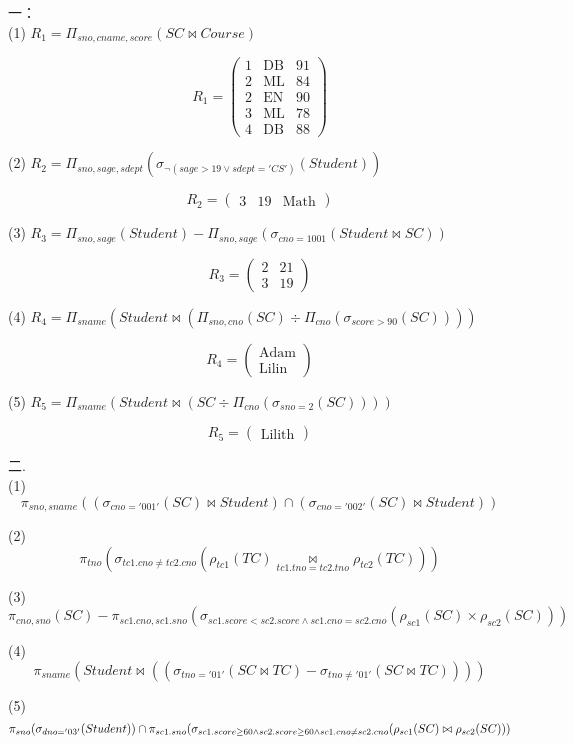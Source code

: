 \documentclass{article}
\begin{document}
一：\\
(1) $R_1 = \Pi_{sno,cname,score}(SC \bowtie Course)$

\[
R_1 = \begin{pmatrix}
1 & \text{DB} & 91 \\
2 & \text{ML} & 84 \\
2 & \text{EN} & 90 \\
3 & \text{ML} & 78 \\
4 & \text{DB} & 88
\end{pmatrix}
\]

(2) $R_2 = \Pi_{sno,sage,sdept}(\sigma_{\neg(sage>19 \vee sdept='CS')}(Student))$

\[
R_2 = \begin{pmatrix}
3 & 19 & \text{Math}
\end{pmatrix}
\]

(3) $R_3 = \Pi_{sno,sage}(Student) - \Pi_{sno,sage}(\sigma_{cno=1001}(Student \bowtie SC))$

\[
R_3 = \begin{pmatrix}
2 & 21 \\
3 & 19
\end{pmatrix}
\]

(4) $R_4 = \Pi_{sname}(Student \bowtie (\Pi_{sno,cno}(SC) \div \Pi_{cno}(\sigma_{score>90}(SC))))$

\[
R_4 = \begin{pmatrix}
\text{Adam} \\
\text{Lilin}
\end{pmatrix}
\]

(5) $R_5 = \Pi_{sname}(Student \bowtie (SC \div \Pi_{cno}(\sigma_{sno=2}(SC))))$

\[
R_5 = \begin{pmatrix}
\text{Lilith}
\end{pmatrix}
\]


二.\\
(1)
\[
\pi_{sno, sname} ((\sigma_{cno='001'} (SC) \bowtie Student) \cap (\sigma_{cno='002'} (SC) \bowtie Student)) 
\]

(2)
\[
\pi_{tno}(\sigma_{tc1.cno \neq tc2.cno} (\rho_{tc1}(TC) \underset{tc1.tno = tc2.tno}{\bowtie} \rho_{tc2}(TC)))
\]

(3)
\[
\pi_{cno, sno} (SC) - \pi_{sc1.cno, sc1.sno} 
(\sigma_{sc1.score < sc2.score \wedge sc1.cno = sc2.cno} (\rho_{sc1}(SC) \times \rho_{sc2}(SC)))
\]

(4)
\[
\pi_{sname} (Student \bowtie ((\sigma_{tno = '01'}(SC \bowtie TC) - \sigma_{tno \neq '01'}(SC \bowtie TC)))) 
\]

(5)
\[
\pi_{sno} (\sigma_{dno='03'} (Student)) \cap \\
\pi_{sc1.sno} (\sigma_{sc1.score \geq 60 \wedge sc2.score \geq 60 \wedge sc1.cno \neq sc2.cno} (\rho_{sc1}(SC) \bowtie \rho_{sc2}(SC)))
\]
\end{document}
